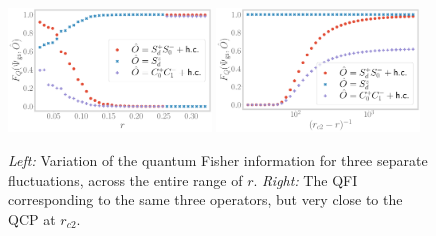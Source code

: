 \documentclass{iopart}
\begin{document}
\begin{figure}[htpb]
	\centering
	\includegraphics[width=0.48\textwidth]{QFI.pdf}
	\includegraphics[width=0.48\textwidth]{rc2-QFI.pdf}
	\caption{{\it Left:} Variation of the quantum Fisher information for three separate fluctuations, across the entire range of \(r\). {\it Right:} The QFI corresponding to the same three operators, but very close to the QCP at \(r_{c2}\).}
	\label{QFI-esiam}
\end{figure}
\end{document}
